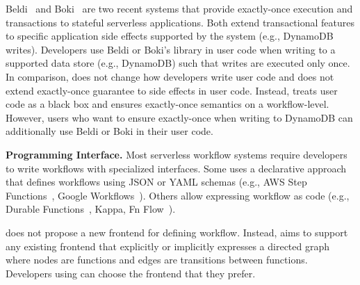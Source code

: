 Beldi~\cite{beldi} and Boki~\cite{boki} are two recent systems that provide
exactly-once execution and transactions to stateful serverless applications.
Both extend transactional features to specific application side effects
supported by the system (e.g., DynamoDB writes). Developers use Beldi or
Boki's library in user code when writing to a supported data store (e.g.,
DynamoDB) such that writes are executed only once. In comparison, \name{} does
not change how developers write user code and does not extend exactly-once
guarantee to side effects in user code. Instead, \name{} treats user code as a
black box and ensures exactly-once semantics on a workflow-level. However,
\name{} users who want to ensure exactly-once when writing to DynamoDB can
additionally use Beldi or Boki in their user code.

\setlength{\parindent}{0pt}
\textbf{Programming Interface.} Most serverless workflow systems require
developers to write workflows with specialized interfaces. Some uses a
declarative approach that defines workflows using JSON or YAML schemas (e.g.,
AWS Step Functions~\cite{aws-step-functions}, Google
Workflows~\cite{google-workflows}). Others allow expressing workflow as code
(e.g., Durable Functions~\cite{durable-functions}, Kappa\cite{kappa}, Fn
Flow~\cite{fn-flow}).

\setlength{\parindent}{10pt}
\name{} does not propose a new frontend for defining workflow. Instead,
\name{} aims to support any existing frontend that explicitly or implicitly
expresses a directed graph where nodes are functions and edges are transitions
between functions. Developers using \name{} can choose the frontend that they
prefer.







